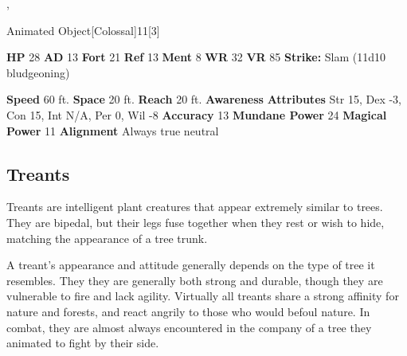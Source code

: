   ,
  \begin{monsubsection}{Animated Object}[Colossal]{11}[3]
    \vspace{-1em}\vspace{-1em}
    \vspace{0em}

    
    

    \begin{spellcontent}
      \begin{spelltargetinginfo}
        \pari \textbf{HP} 28 \monsep
          \textbf{AD} 13 \monsep
          \textbf{Fort} 21 \monsep
          \textbf{Ref} 13 \monsep
          \textbf{Ment} 8
        \pari \textbf{WR} 32 \monsep
        \textbf{VR} 85
        \pari \textbf{Strike:}
            Slam  (11d10 bludgeoning)
      \end{spelltargetinginfo}
    \end{spellcontent}
    \begin{monsterfooter}
      \pari \textbf{Speed} 60 ft. \monsep
        \textbf{Space} 20 ft. \monsep
        \textbf{Reach} 20 ft.
      \pari \textbf{Awareness} 
      \pari \textbf{Attributes}
        Str 15, Dex -3,
        Con 15, Int N/A,
        Per 0, Wil -8
      \pari \textbf{Accuracy} 13 \monsep
        \textbf{Mundane Power} 24 \monsep
      \textbf{Magical Power} 11
      \pari \textbf{Alignment} Always true neutral
    \end{monsterfooter}
  \end{monsubsection}
  
  
  
    \subsection{Treants}
      
    Treants are intelligent plant creatures that appear extremely similar to trees.
    They are bipedal, but their legs fuse together when they rest or wish to hide, matching the appearance of a tree trunk.

    A treant's appearance and attitude generally depends on the type of tree it resembles.
    They they are generally both strong and durable, though they are vulnerable to fire and lack agility.
    Virtually all treants share a strong affinity for nature and forests, and react angrily to those who would befoul nature.
    In combat, they are almost always encountered in the company of a tree they animated to fight by their side.
  

